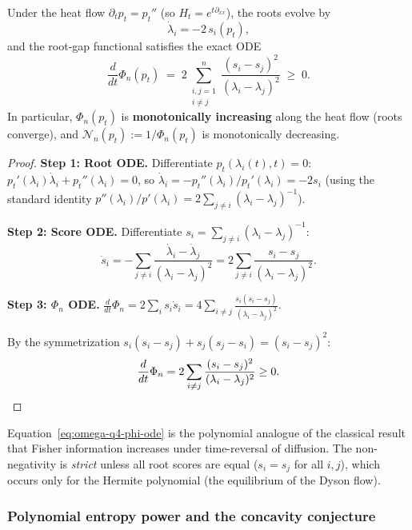 \begin{proposition}\label{prop:omega-q4-score-ode}
Under the heat flow $\partial_t p_t = p_t''$
(so $H_t=e^{t\partial_{xx}}$), the roots evolve by
\begin{equation}\label{eq:omega-q4-root-ode}
\dot\lambda_i = -2\,s_i(p_t),
\end{equation}
and the root-gap functional satisfies the exact ODE
\begin{equation}\label{eq:omega-q4-phi-ode}
\frac{d}{dt}\Phi_n(p_t)
\;=\; 2\sum_{\substack{i,j=1\\i\ne j}}^n
\frac{(s_i-s_j)^2}{(\lambda_i-\lambda_j)^2}
\;\ge\; 0.
\end{equation}
In particular, $\Phi_n(p_t)$ is \textbf{monotonically increasing}
along the heat flow (roots converge), and
$\mathcal N_n(p_t):=1/\Phi_n(p_t)$ is monotonically decreasing.
\end{proposition}

\begin{proof}
\textbf{Step 1: Root ODE.}
Differentiate $p_t(\lambda_i(t),t)=0$:
$p_t'(\lambda_i)\dot\lambda_i + p_t''(\lambda_i) = 0$,
so $\dot\lambda_i = -p_t''(\lambda_i)/p_t'(\lambda_i) = -2 s_i$
(using the standard identity $p''(\lambda_i)/p'(\lambda_i)
= 2\sum_{j\ne i}(\lambda_i-\lambda_j)^{-1}$).

\textbf{Step 2: Score ODE.}
Differentiate $s_i = \sum_{j\ne i}(\lambda_i-\lambda_j)^{-1}$:
\[
\dot s_i = -\sum_{j\ne i}\frac{\dot\lambda_i-\dot\lambda_j}{(\lambda_i-\lambda_j)^2}
= 2\sum_{j\ne i}\frac{s_i - s_j}{(\lambda_i-\lambda_j)^2}.
\]

\textbf{Step 3: $\Phi_n$ ODE.}
$\frac{d}{dt}\Phi_n = 2\sum_i s_i\dot s_i
= 4\sum_{i\ne j}\frac{s_i(s_i-s_j)}{(\lambda_i-\lambda_j)^2}$.

By the symmetrization $s_i(s_i-s_j)+s_j(s_j-s_i) = (s_i-s_j)^2$:
\[
\frac{d}{dt}\Phi_n
= 2\sum_{i\ne j}\frac{(s_i-s_j)^2}{(\lambda_i-\lambda_j)^2}
\ge 0. \qedhere
\]
\end{proof}

\begin{remark}
Equation~\eqref{eq:omega-q4-phi-ode} is the polynomial analogue
of the classical result that Fisher information increases
under time-reversal of diffusion.
The non-negativity is \emph{strict} unless all root scores are equal
($s_i=s_j$ for all $i,j$), which occurs only for the Hermite
polynomial (the equilibrium of the Dyson flow).
\end{remark}

\subsubsection{Polynomial entropy power and the concavity conjecture}

